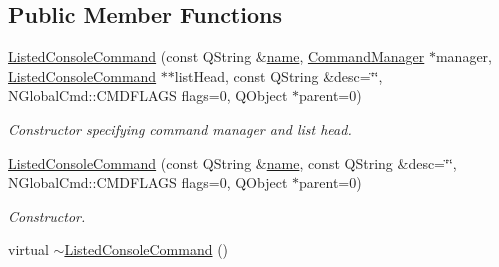 \subsection*{Public Member Functions}
\begin{DoxyCompactItemize}
\item 
\hyperlink{class_listed_console_command_acbc2c1e24ef3fffd8d8f2b7d12b5b309}{Listed\-Console\-Command} (const Q\-String \&\hyperlink{class_base_console_command_a2f21764f46a3864a362eae2e3396e363}{name}, \hyperlink{class_command_manager}{Command\-Manager} $\ast$manager, \hyperlink{class_listed_console_command}{Listed\-Console\-Command} $\ast$$\ast$list\-Head, const Q\-String \&desc=\char`\"{}\char`\"{}, N\-Global\-Cmd\-::\-C\-M\-D\-F\-L\-A\-G\-S flags=0, Q\-Object $\ast$parent=0)
\begin{DoxyCompactList}\small\item\em Constructor specifying command manager and list head. \end{DoxyCompactList}\item 
\hyperlink{class_listed_console_command_a689a422172ced5156ba2b34ff1c2a800}{Listed\-Console\-Command} (const Q\-String \&\hyperlink{class_base_console_command_a2f21764f46a3864a362eae2e3396e363}{name}, const Q\-String \&desc=\char`\"{}\char`\"{}, N\-Global\-Cmd\-::\-C\-M\-D\-F\-L\-A\-G\-S flags=0, Q\-Object $\ast$parent=0)
\begin{DoxyCompactList}\small\item\em Constructor. \end{DoxyCompactList}\item 
\hypertarget{class_listed_console_command_ae69ccf94cc5ba599b6e338711e48627a}{virtual \hyperlink{class_listed_console_command_ae69ccf94cc5ba599b6e338711e48627a}{$\sim$\-Listed\-Console\-Command} ()}\label{class_listed_console_command_ae69ccf94cc5ba599b6e338711e48627a}


\end{DoxyCompactItemize}
